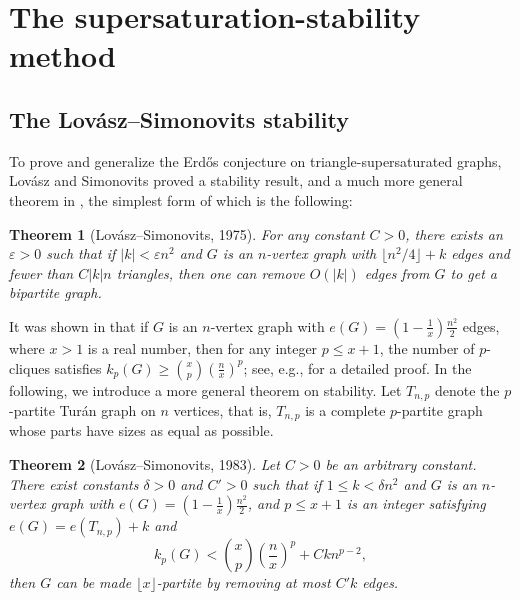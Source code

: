 \documentclass[11pt]{article}
\newtheorem{theorem}{Theorem}[section]
\begin{document}
\section{The supersaturation-stability method}

\label{sec4}

\subsection{The Lov\'{a}sz--Simonovits stability}


To prove and generalize the Erd\H{o}s conjecture on 
triangle-supersaturated graphs, Lov\'{a}sz and Simonovits \cite{LS1975} 
proved a stability result, 
and a much more general theorem in \cite{LS1983}, 
 the simplest form of which is the following: 

\begin{theorem}[Lov\'{a}sz--Simonovits, 1975]
For any constant $C>0$, there exists an $\varepsilon >0$ 
such that if $|k|< \varepsilon n^2$ and $G$ is an $n$-vertex graph with 
$\lfloor n^2/4 \rfloor +k$ edges and fewer than 
$C|k| n$ triangles, then one can remove $O(|k|)$ edges from 
$G$ to get a bipartite graph. 
\end{theorem}


It was shown in \cite{LS1983}  that if $G$ is an $n$-vertex graph with 
$e(G)=(1-\frac{1}{x})\frac{n^2}{2}$ edges, where $x > 1$ is a real number, 
then for any integer $p\le x+1$, 
the number of $p$-cliques satisfies $k_p(G)\ge {x \choose p} (\frac{n}{x})^p$; 
see, e.g., \cite[p. 449]{Lov1979} for a detailed proof.  
In the following, we introduce a more general theorem on stability.  
Let $T_{n,p}$ denote the $p$-partite Tur\'{a}n graph on $n$ vertices, that is,  $T_{n,p}$ is a complete $p$-partite graph 
 whose parts have sizes as equal as possible.  

\begin{theorem}[Lov\'{a}sz--Simonovits, 1983]
Let $C>0$ be an arbitrary constant. 
There exist constants $\delta >0$ and $C' >0$ such that 
if $1\le k < \delta n^2$ and $G$ is an $n$-vertex graph with 
$e(G)=(1-\frac{1}{x})\frac{n^2}{2}$, and $p\le x+1$ is an integer 
satisfying $e(G)=e(T_{n,p}) +k$  and 
\[ k_p(G) < {x \choose p} \left( \frac{n}{x}\right)^p + Ckn^{p-2}, \]
then $G$ can be made $\lfloor x \rfloor$-partite 
by removing at most $C'k$ edges. 
\end{theorem}
\end{document}
